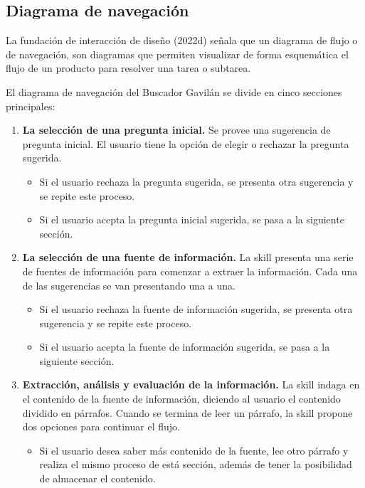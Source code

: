
\subsection{Diagrama de navegación}
\label{DiagramaNavegacioncapIV}

La fundación de interacción de diseño (2022d) señala que un diagrama de flujo o de navegación, son diagramas que permiten visualizar de forma esquemática el flujo de un producto para resolver una tarea o subtarea.

El diagrama de navegación del Buscador Gavilán se divide en cinco secciones principales:

\begin{enumerate}
  \item \textbf{La selección de una pregunta inicial.} Se provee una sugerencia de pregunta inicial. El usuario tiene la opción de elegir o rechazar la pregunta sugerida.
  \begin{itemize}
    \item Si el usuario rechaza la pregunta sugerida, se presenta otra sugerencia y se repite este proceso.
    \item Si el usuario acepta la pregunta inicial sugerida, se pasa a la siguiente sección.
  \end{itemize}
  \item \textbf{La selección de una fuente de información.} La skill presenta una serie de fuentes de información para comenzar a extraer la información. Cada una de las sugerencias se van presentando una a una.
  \begin{itemize}
    \item Si el usuario rechaza la fuente de información sugerida, se presenta otra sugerencia y se repite este proceso.
    \item Si el usuario acepta la fuente de información sugerida, se pasa a la siguiente sección.
  \end{itemize}
  \item \textbf{Extracción, análisis y evaluación de la información.} La skill indaga en el contenido de la fuente de información, diciendo al usuario el contenido dividido en párrafos. Cuando se termina de leer un párrafo, la skill propone dos opciones para continuar el flujo.
  \begin{itemize}
    \item Si el usuario desea saber más contenido de la fuente, lee otro párrafo y realiza el mismo proceso de está sección, además de tener la posibilidad de almacenar el contenido.

\end{itemize}
\end{enumerate}
